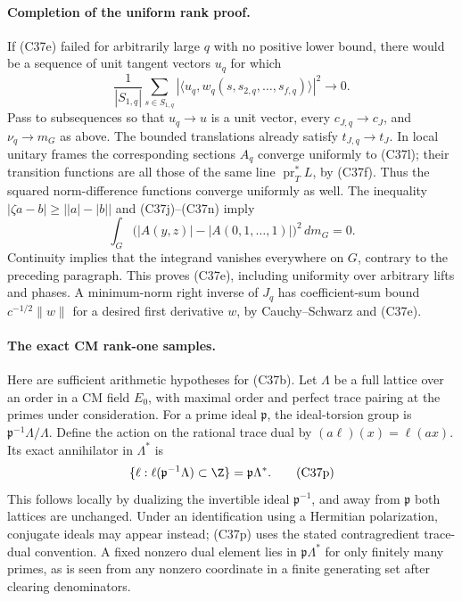 \documentclass[11pt]{article}
\theoremstyle{definition}\newtheorem{definition}[theorem]{Definition}\newtheorem{remark}[theorem]{Remark}
\begin{document}
\paragraph{Completion of the uniform rank proof.}
If (C37e) failed for arbitrarily large $q$ with no positive lower
bound, there would be a sequence of unit tangent vectors $u_q$
for which
\[
  \frac1{|S_{1,q}|}\sum_{s\in S_{1,q}}
       |\langle u_q,w_q(s,s_{2,q},\ldots,s_{f,q})\rangle|^2
                  \longrightarrow0.
 \tag{C37n}
\]
Pass to subsequences so that $u_q\to u$ is a unit vector,
every $c_{J,q}\to c_J$, and $\nu_q\to m_G$ as above.
The bounded translations already satisfy $t_{J,q}\to t_J$.
In local unitary frames the corresponding sections $A_q$ converge
uniformly to (C37l); their transition functions are all those of
the same line $\operatorname{pr}_T^*L$, by (C37f).  Thus the
squared norm-difference functions converge uniformly as well.
The inequality $|\zeta a-b|\ge\bigl||a|-|b|\bigr|$ and
(C37j)--(C37n) imply
\[
       \int_G\bigl(|A(y,z)|-|A(0,1,\ldots,1)|\bigr)^2\,dm_G=0.
 \tag{C37o}
\]
Continuity implies that the integrand vanishes everywhere on
$G$, contrary to the preceding paragraph.  This proves (C37e),
including uniformity over arbitrary lifts and phases.  A
minimum-norm right inverse of $J_q$ has coefficient-sum bound
$c^{-1/2}\|w\|$ for a desired first derivative $w$, by
Cauchy--Schwarz and (C37e).

\paragraph{The exact CM rank-one samples.}
Here are sufficient arithmetic hypotheses for (C37b).  Let
$\Lambda$ be a full lattice over an order in a CM field $E_0$,
with maximal order and perfect trace pairing at the primes under
consideration.  For a prime ideal $\mathfrak p$, the ideal-torsion
group is $\mathfrak p^{-1}\Lambda/\Lambda$.  Define the action
on the rational trace dual by $(a\ell)(x)=\ell(ax)$.  Its exact
annihilator in $\Lambda^*$ is
\[
 \{\ell:\ell(\mathfrak p^{-1}\Lambda)\subset\Z\}
                        =\mathfrak p\Lambda^*.
 \tag{C37p}
\]
This follows locally by dualizing the invertible ideal
$\mathfrak p^{-1}$, and away from $\mathfrak p$ both lattices
are unchanged.  Under an identification using a Hermitian
polarization, conjugate ideals may appear instead; (C37p) uses
the stated contragredient trace-dual convention.  A fixed nonzero
dual element lies in $\mathfrak p\Lambda^*$ for only finitely
many primes, as is seen from any nonzero coordinate in a finite
generating set after clearing denominators.
\end{document}
